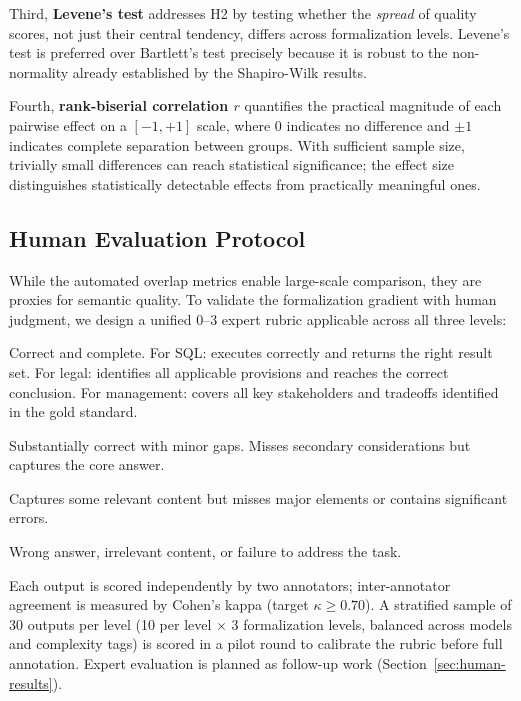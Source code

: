 \documentclass[runningheads]{llncs}
\begin{document}
Third, \textbf{Levene's test} addresses H2 by testing whether the \emph{spread} of quality scores, not just their central tendency, differs across formalization levels. Levene's test is preferred over Bartlett's test precisely because it is robust to the non-normality already established by the Shapiro-Wilk results.

Fourth, \textbf{rank-biserial correlation $r$} quantifies the practical magnitude of each pairwise effect on a $[-1, +1]$ scale, where $0$ indicates no difference and $\pm 1$ indicates complete separation between groups. With sufficient sample size, trivially small differences can reach statistical significance; the effect size distinguishes statistically detectable effects from practically meaningful ones.

\subsection{Human Evaluation Protocol}
\label{sec:human-eval}

While the automated overlap metrics enable large-scale comparison, they are proxies for semantic quality. To validate the formalization gradient with human judgment, we design a unified 0--3 expert rubric applicable across all three levels:

\begin{description}[noitemsep]
  \item[3 (Excellent):] Correct and complete. For SQL: executes correctly and returns the right result set. For legal: identifies all applicable provisions and reaches the correct conclusion. For management: covers all key stakeholders and tradeoffs identified in the gold standard.
  \item[2 (Adequate):] Substantially correct with minor gaps. Misses secondary considerations but captures the core answer.
  \item[1 (Partial):] Captures some relevant content but misses major elements or contains significant errors.
  \item[0 (Incorrect):] Wrong answer, irrelevant content, or failure to address the task.
\end{description}

\noindent Each output is scored independently by two annotators; inter-annotator agreement is measured by Cohen's kappa (target $\kappa \geq 0.70$). A stratified sample of 30 outputs per level (10 per level $\times$ 3 formalization levels, balanced across models and complexity tags) is scored in a pilot round to calibrate the rubric before full annotation. Expert evaluation is planned as follow-up work (Section~\ref{sec:human-results}).
\end{document}
